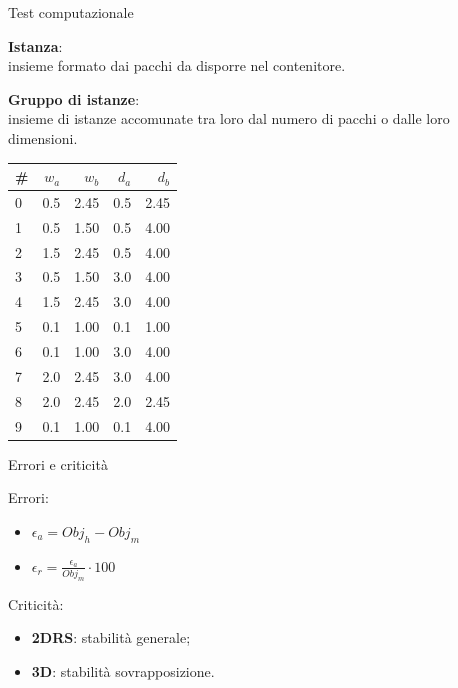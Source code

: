 \documentclass{beamer}
\begin{document}
\begin{frame}{Test computazionale}
	\begin{minipage}[c]{0.45\textwidth}
		\textbf{Istanza}:\\ insieme formato dai pacchi da disporre nel contenitore.
		\vspace{.5cm}

		\textbf{Gruppo di istanze}:\\ insieme di istanze accomunate tra loro dal numero di pacchi o dalle loro dimensioni.

	\end{minipage}
	\hfill
	\begin{minipage}[c]{0.45\textwidth}
		\begin{center}
			\begin{tabular}{l |r|r|r|r}
				\# & $w_a$ & $w_b$ & $d_a$ & $d_b$ \\
				\hline	
				0  & 0.5   & 2.45  & 0.5   & 2.45  \\
				1  & 0.5   & 1.50  & 0.5   & 4.00  \\
				2  & 1.5   & 2.45  & 0.5   & 4.00  \\
				3  & 0.5   & 1.50  & 3.0   & 4.00  \\
				4  & 1.5   & 2.45  & 3.0   & 4.00  \\
				5  & 0.1   & 1.00  & 0.1   & 1.00  \\
				6  & 0.1   & 1.00  & 3.0   & 4.00  \\
				7  & 2.0   & 2.45  & 3.0   & 4.00  \\
				8  & 2.0   & 2.45  & 2.0   & 2.45  \\
				9  & 0.1   & 1.00  & 0.1   & 4.00  \\
			\end{tabular}
		\end{center}
	\end{minipage}
\end{frame}

\begin{frame}{Errori e criticit\`a}
	\begin{minipage}[c]{0.45\textwidth}
		Errori:
		\begin{itemize}
			\item $\epsilon_a = Obj_h - Obj_m$
			\item $\epsilon_r = \frac{\epsilon_a}{Obj_m} \cdot 100$
		\end{itemize}	\end{minipage}
	\hfill
	\begin{minipage}[c]{0.45\textwidth}
		Criticit\`a:
		\begin{itemize}
			\item \textbf{2DRS}: stabilit\`a generale;
			\item \textbf{3D}: stabilit\`a sovrapposizione.
		\end{itemize}	\end{minipage}
\end{frame}
\end{document}
